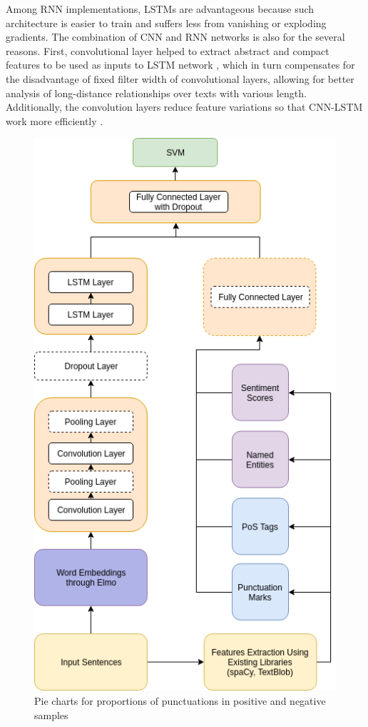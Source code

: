 \documentclass[12pt]{diazessay} %
\begin{document}
Among RNN implementations, LSTMs are advantageous because such architecture is easier to train and suffers less from vanishing or exploding gradients. The combination of CNN and RNN networks is also  for the several reasons. First, convolutional layer helped to extract abstract and compact features to be used as inputs to LSTM network \citep{chan2015}, which in turn compensates for the disadvantage of fixed filter width of convolutional layers, allowing for better analysis of long-distance relationships over texts with various length. Additionally, the convolution layers reduce feature variations so that CNN-LSTM work more efficiently \citep{ghosh2016}.

\begin{figure} 
	\includegraphics[height=0.7\textheight, center]{graphs/nn_architecture.png}
	\caption{Pie charts for proportions of punctuations in positive and negative samples}
	\medskip
	\small
	\label{figure:nnarchitecture}
\end{figure}
\end{document}
